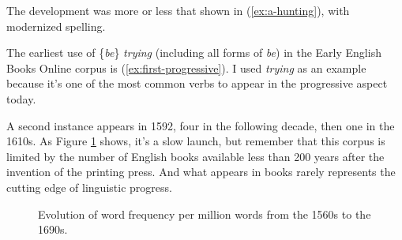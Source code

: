 The development was more or less that shown in (\ref{ex:a-hunting}), with modernized spelling.

\ea \label{ex:a-hunting}
 \z
\z

The earliest use of \{\textit{be}\} \textit{trying} (including all forms of \textit{be}) in the Early English Books Online corpus is (\ref{ex:first-progressive}). I used \textit{trying} as an example because it's one of the most common verbs to appear in the progressive aspect today.

\label{ex:first-progressive}
\z

A second instance appears in 1592, four in the following decade, then one in the 1610s. As Figure \ref{fig:be-trying-eebo} shows, it's a slow launch, but remember that this corpus is limited by the number of English books available less than 200 years after the invention of the printing press. And what appears in books rarely represents the cutting edge of linguistic progress.

\begin{figure}[h!]
 \centering
 \caption{Evolution of word frequency per million words from the 1560s to the 1690s.}\label{fig:be-trying-eebo}
\end{figure}

